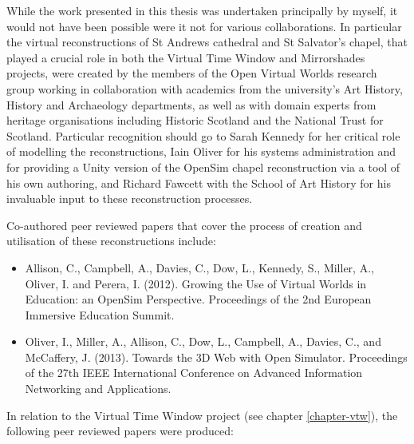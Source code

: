 While the work presented in this thesis was undertaken principally by myself, it would not have been possible were it not for various collaborations. In particular the virtual reconstructions of St Andrews cathedral and St Salvator's chapel, that played a crucial role in both the Virtual Time Window and Mirrorshades projects, were created by the members of the Open Virtual Worlds research group working in collaboration with academics from the university's Art History, History and Archaeology departments, as well as with domain experts from heritage organisations including Historic Scotland and the National Trust for Scotland. Particular recognition should go to Sarah Kennedy for her critical role of modelling the reconstructions, Iain Oliver for his systems administration and for providing a Unity version of the OpenSim chapel reconstruction via a tool of his own authoring, and Richard Fawcett with the School of Art History for his invaluable input to these reconstruction processes.


Co-authored peer reviewed papers that cover the process of creation and utilisation of these reconstructions include:

\begin{itemize}

	\item Allison, C., Campbell, A., Davies, C., Dow, L., Kennedy, S., Miller, A., Oliver, I. and Perera, I. (2012). Growing the Use of Virtual Worlds in Education: an OpenSim Perspective. Proceedings of the 2nd European Immersive Education Summit.
	
	\item Oliver, I., Miller, A., Allison, C., Dow, L., Campbell, A., Davies, C., and McCaffery, J. (2013). Towards the 3D Web with Open Simulator. Proceedings of the 27th IEEE International Conference on Advanced Information Networking and Applications.

\end{itemize}


In relation to the Virtual Time Window project (see chapter \ref{chapter-vtw}), the following peer reviewed papers were produced:

